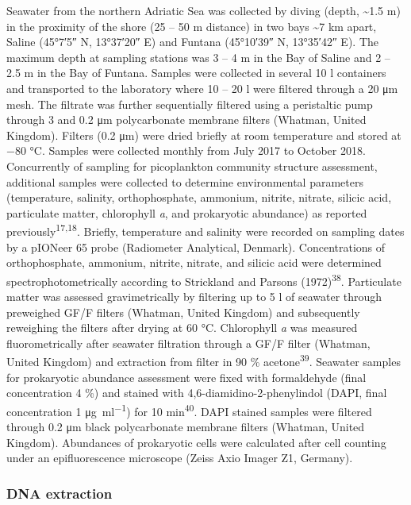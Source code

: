 \documentclass[
  12pt,
]{article}
\begin{document}
Seawater from the northern Adriatic Sea was collected by diving (depth,
\textasciitilde1.5 \si{\m}) in the proximity of the shore (25 -- 50
\si{\m} distance) in two bays \textasciitilde7 \si{\km} apart, Saline
(\ang{45;7;5} N, \ang{13;37;20} E) and Funtana (\ang{45;10;39} N,
\ang{13;35;42} E). The maximum depth at sampling stations was 3 -- 4
\si{\m} in the Bay of Saline and 2 -- 2.5 \si{\m} in the Bay of Funtana.
Samples were collected in several 10 \si{\l} containers and transported
to the laboratory where 10 -- 20 \si{\l} were filtered through a 20
\si{\um} mesh. The filtrate was further sequentially filtered using a
peristaltic pump through 3 and 0.2 \si{\um} polycarbonate membrane
filters (Whatman, United Kingdom). Filters (0.2 \si{\um}) were dried
briefly at room temperature and stored at \num{-80} \si{\degreeCelsius}.
Samples were collected monthly from July 2017 to October 2018.
Concurrently of sampling for picoplankton community structure
assessment, additional samples were collected to determine environmental
parameters (temperature, salinity, orthophosphate, ammonium, nitrite,
nitrate, silicic acid, particulate matter, chlorophyll \emph{a}, and
prokaryotic abundance) as reported previously\textsuperscript{17,18}.
Briefly, temperature and salinity were recorded on sampling dates by a
pIONeer 65 probe (Radiometer Analytical, Denmark). Concentrations of
orthophosphate, ammonium, nitrite, nitrate, and silicic acid were
determined spectrophotometrically according to Strickland and Parsons
(1972)\textsuperscript{38}. Particulate matter was assessed
gravimetrically by filtering up to 5 \si{\l} of seawater through
preweighed GF/F filters (Whatman, United Kingdom) and subsequently
reweighing the filters after drying at 60 \si{\degreeCelsius}.
Chlorophyll \emph{a} was measured fluorometrically after seawater
filtration through a GF/F filter (Whatman, United Kingdom) and
extraction from filter in 90 \si{\percent} acetone\textsuperscript{39}.
Seawater samples for prokaryotic abundance assessment were fixed with
formaldehyde (final concentration 4 \si{\percent}) and stained with
4,6-diamidino-2-phenylindol (DAPI, final concentration 1
\si{\ug\per\ml}) for 10 \si{\minute}\textsuperscript{40}. DAPI stained
samples were filtered through 0.2 \si{\um} black polycarbonate membrane
filters (Whatman, United Kingdom). Abundances of prokaryotic cells were
calculated after cell counting under an epifluorescence microscope
(Zeiss Axio Imager Z1, Germany).

\hypertarget{dna-extraction}{%
\subsubsection{DNA extraction}\label{dna-extraction}}
\end{document}
